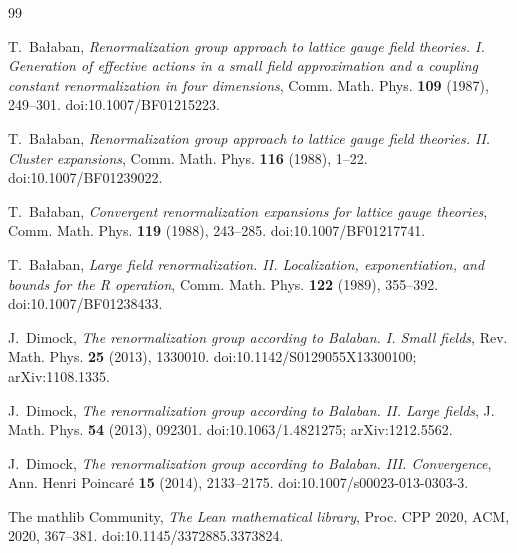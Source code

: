 \documentclass[11pt,a4paper]{article}
\theoremstyle{definition}
\begin{document}
\begin{thebibliography}{99}
\small

 T.~Ba{\l}aban,
\emph{Renormalization group approach to lattice gauge field theories.
I. Generation of effective actions in a small field approximation and a
coupling constant renormalization in four dimensions},
Comm. Math. Phys. \textbf{109} (1987), 249--301.
doi:10.1007/BF01215223.

 T.~Ba{\l}aban,
\emph{Renormalization group approach to lattice gauge field theories.
II. Cluster expansions}, Comm. Math. Phys. \textbf{116} (1988), 1--22.
doi:10.1007/BF01239022.

 T.~Ba{\l}aban,
\emph{Convergent renormalization expansions for lattice gauge theories},
Comm. Math. Phys. \textbf{119} (1988), 243--285.
doi:10.1007/BF01217741.

 T.~Ba{\l}aban,
\emph{Large field renormalization. II. Localization, exponentiation, and
bounds for the R operation}, Comm. Math. Phys. \textbf{122} (1989), 355--392.
doi:10.1007/BF01238433.

 J.~Dimock,
\emph{The renormalization group according to Balaban. I. Small fields},
Rev. Math. Phys. \textbf{25} (2013), 1330010.
doi:10.1142/S0129055X13300100; arXiv:1108.1335.

 J.~Dimock,
\emph{The renormalization group according to Balaban. II. Large fields},
J. Math. Phys. \textbf{54} (2013), 092301.
doi:10.1063/1.4821275; arXiv:1212.5562.

 J.~Dimock,
\emph{The renormalization group according to Balaban. III. Convergence},
Ann. Henri Poincar\'e \textbf{15} (2014), 2133--2175.
doi:10.1007/s00023-013-0303-3.

 The mathlib Community,
\emph{The Lean mathematical library}, Proc. CPP 2020, ACM, 2020,
367--381. doi:10.1145/3372885.3373824.

\end{thebibliography}
\end{document}
